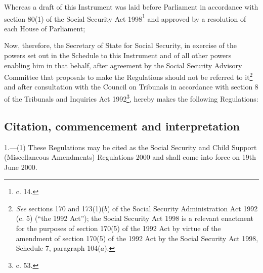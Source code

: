 \documentclass[12pt,a4paper]{article}
\title{\regstitle}
\author{S.I. 2000 No. 1596}
\date{Made
15th June 2000\\
Coming into force
19th June 2000}
\begin{document}
\maketitle

\noindent
Whereas a draft of this Instrument was laid before Parliament in accordance with section 80(1) of the Social Security Act 1998\footnote{ c. 14.} and approved by a resolution of each House of Parliament;

Now, therefore, the Secretary of State for Social Security, in exercise of the powers set out in the Schedule to this Instrument and of all other powers enabling him in that behalf, after agreement by the Social Security Advisory Committee that proposals to make the Regulations should not be referred to it\footnote{\frenchspacing \emph{See} sections 170 and 173(1)($b$) of the Social Security Administration Act 1992 (c. 5) (“the 1992 Act”); the Social Security Act 1998 is a relevant enactment for the purposes of section 170(5) of the 1992 Act by virtue of the amendment of section 170(5) of the 1992 Act by the Social Security Act 1998, Schedule 7, paragraph 104($a$).} and after consultation with the Council on Tribunals in accordance with section 8 of the Tribunals and Inquiries Act 1992\footnote{ c. 53.}, hereby makes the following Regulations: 

{\sloppy

\tableofcontents

}

\bigskip

\setcounter{secnumdepth}{-2}

\subsection[1. Citation, commencement and interpretation]{Citation, commencement and interpretation}

1.---(1)  These Regulations may be cited as the Social Security and Child Support (Miscellaneous Amendments) Regulations 2000 and shall come into force on 19th June 2000.
\end{document}
